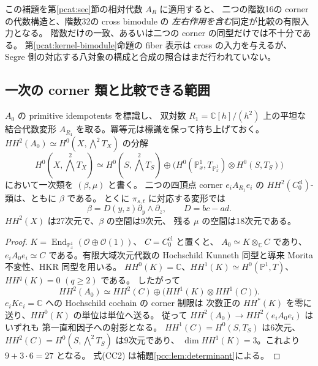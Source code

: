 この補題を第\ref{pcat:sec}節の相対代数 $A_R$ に適用すると、
二つの階数16の corner の代数構造と、階数32の cross bimodule の
\emph{左右作用を含む}同定が比較の有限入力となる。
階数だけの一致、あるいは二つの corner の同型だけでは不十分である。
第\ref{pcat:kernel-bimodule}命題の fiber 表示は cross の入力を与えるが、
Segre 側の対応する八対象の構成と合成の照合はまだ行われていない。

\subsection{一次の corner 類と比較できる範囲}

\begin{proposition}
\label{pcc:prop:corner-KS}
$A_0$ の primitive idempotents を標識し、
双対数 $R_1=\mathbb C[h]/(h^2)$ 上の平坦な結合代数変形
$A_{R_1}$ を取る。冪等元は標識を保って持ち上げておく。
$HH^2(A_0)\simeq H^0(X,\bigwedge^2T_X)$ の分解
\[
 H^0(X,\bigwedge^2T_X)
 \simeq H^0(S,\bigwedge^2T_S)
 \oplus
 \bigl(H^0(\mathbb P^1_x,T_{\mathbb P^1_x})
 \otimes H^0(S,T_S)\bigr)
 \tag{CC1}
\]
において一次類を $(\beta,\mu)$ と書く。
二つの四頂点 corner $e_iA_{R_1}e_i$ の
$HH^2(C_0^{\mathrm{cl}})$-類は、ともに $\beta$ である。
とくに $\pi_{s,t}$ に対応する変形では
\[
 \beta=D(y,z)\partial_y\wedge\partial_z,
 \qquad D=bc-ad.
 \tag{CC2}
\]
$HH^2(X)$ は27次元で、$\beta$ の空間は9次元、
残る $\mu$ の空間は18次元である。
\end{proposition}
\begin{proof}
$K=\operatorname{End}_{\mathbb P^1_x}(\mathcal O\oplus\mathcal O(1))$、
$C=C_0^{\mathrm{cl}}$ と置くと、
$A_0\simeq K\otimes_{\mathbb C}C$ であり、
$e_iA_0e_i\simeq C$ である。有限大域次元代数の
Hochschild Kunneth 同型と導来 Morita 不変性、HKR 同型を用いる。
$HH^0(K)=\mathbb C$、$HH^1(K)\simeq H^0(\mathbb P^1,T)$、
$HH^q(K)=0$ $(q\ge2)$ である。
したがって
\[
 HH^2(A_0)\simeq HH^2(C)\oplus
       \bigl(HH^1(K)\otimes HH^1(C)\bigr).
\]
$e_iKe_i=\mathbb C$ への Hochschild cochain の corner 制限は
次数正の $HH^*(K)$ を零に送り、$HH^0(K)$ の単位は単位へ送る。
従って $HH^2(A_0)\to HH^2(e_iA_0e_i)$ はいずれも
第一直和因子への射影となる。
$HH^1(C)=H^0(S,T_S)$ は6次元、
$HH^2(C)=H^0(S,\bigwedge^2T_S)$ は9次元であり、
$\dim HH^1(K)=3$。これより $9+3\cdot6=27$ となる。
式(CC2) は補題\ref{pcc:lem:determinant}による。
\end{proof}

